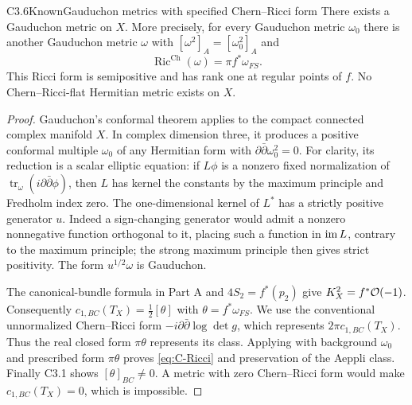 \begin{claim}{C3.6}{Known}{Gauduchon metrics with specified Chern--Ricci form}
There exists a Gauduchon metric on $X$.  More precisely, for every
Gauduchon metric $\omega_0$ there is another Gauduchon metric
$\omega$ with $[\omega^2]_A=[\omega_0^2]_A$ and
\begin{equation}\label{eq:C-Ricci}
\operatorname{Ric}^{\mathrm{Ch}}(\omega)=\pi f^*\omega_{FS}.
\end{equation}
This Ricci form is semipositive and has rank one at regular points
of $f$.  No Chern--Ricci-flat Hermitian metric exists on $X$.
\end{claim}
\begin{proof}
Gauduchon's conformal theorem
\citep[Theorem 2, pp. 132--133]{Gauduchon1985} applies to the compact
connected complex manifold $X$.  In complex dimension three, it
produces a positive conformal multiple $\omega_0$ of any Hermitian
form with $\partial\bar\partial\omega_0^2=0$.
For clarity, its reduction is a scalar elliptic equation: if
$L\phi$ is a nonzero fixed normalization of
$\operatorname{tr}_\omega(i\partial\bar\partial\phi)$, then
$L$ has kernel the constants by the maximum principle and Fredholm
index zero.  The one-dimensional kernel of $L^*$ has a strictly
positive generator $u$.  Indeed a sign-changing generator would
admit a nonzero nonnegative function orthogonal to it, placing such
a function in $\operatorname{im} L$, contrary to the maximum principle; the strong
maximum principle then gives strict positivity.  The form
$u^{1/2}\omega$ is Gauduchon.

The canonical-bundle formula in Part A and $4S_2=f^*(p_2)$ give
$K_X^2=f^*\mathcal O(-1)$.  Consequently
$c_{1,BC}(T_X)=\tfrac12[\theta]$ with
$\theta=f^*\omega_{FS}$.  We use the conventional unnormalized
Chern--Ricci form $-i\partial\bar\partial\log\det g$,
which represents $2\pi c_{1,BC}(T_X)$.  Thus the real closed form
$\pi\theta$ represents its class.  Applying
\citet[Theorem 1.3]{STW2017} with background $\omega_0$ and prescribed
form $\pi\theta$ proves \eqref{eq:C-Ricci} and preservation of the
Aeppli class.  Finally C3.1 shows $[\theta]_{BC}\ne0$.  A metric
with zero Chern--Ricci form would make $c_{1,BC}(T_X)=0$, which is
impossible.
\end{proof}

